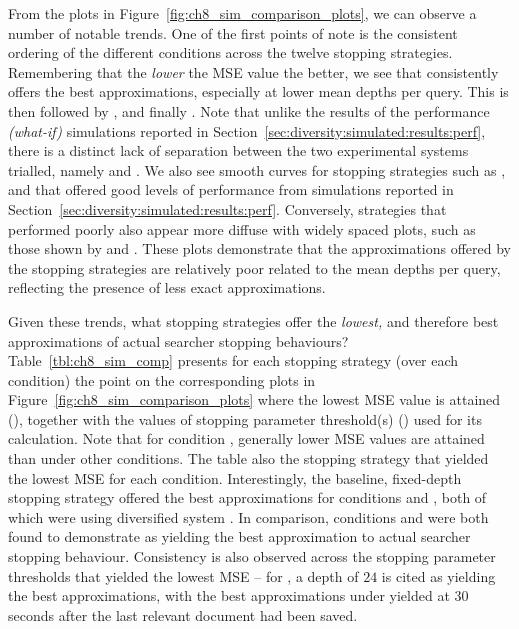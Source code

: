From the plots in Figure~\ref{fig:ch8_sim_comparison_plots}, we can observe a number of notable trends. One of the first points of note is the consistent ordering of the different conditions across the twelve stopping strategies. Remembering that the \emph{lower} the MSE value the better, we see that  consistently offers the best approximations, especially at lower mean depths per query. This is then followed by ,  and finally . Note that unlike the results of the performance \emph{(what-if)} simulations reported in Section~\ref{sec:diversity:simulated:results:perf}, there is a distinct lack of separation between the two experimental systems trialled, namely  and . We also see smooth curves for stopping strategies such as ,  and  that offered good levels of performance from simulations reported in Section~\ref{sec:diversity:simulated:results:perf}. Conversely, strategies that performed poorly also appear more diffuse with widely spaced plots, such as those shown by  and . These plots demonstrate that the approximations offered by the stopping strategies are relatively poor related to the mean depths per query, reflecting the presence of less exact approximations.

Given these trends, what stopping strategies offer the \emph{lowest,} and therefore best approximations of actual searcher stopping behaviours? Table~\ref{tbl:ch8_sim_comp} presents for each stopping strategy (over each condition) the point on the corresponding plots in Figure~\ref{fig:ch8_sim_comparison_plots} where the lowest MSE value is attained (), together with the values of stopping parameter threshold(s) () used for its calculation. Note that for condition , generally lower MSE values are attained than under other conditions. The table also  the stopping strategy that yielded the lowest MSE for each condition. Interestingly, the baseline, fixed-depth stopping strategy  offered the best approximations for conditions  and , both of which were using diversified system . In comparison, conditions  and  were both found to demonstrate  as yielding the best approximation to actual searcher stopping behaviour. Consistency is also observed across the stopping parameter thresholds that yielded the lowest MSE -- for , a depth of $24$ is cited as yielding the best approximations, with the best approximations under  yielded at $30$ seconds after the last relevant document had been saved.

